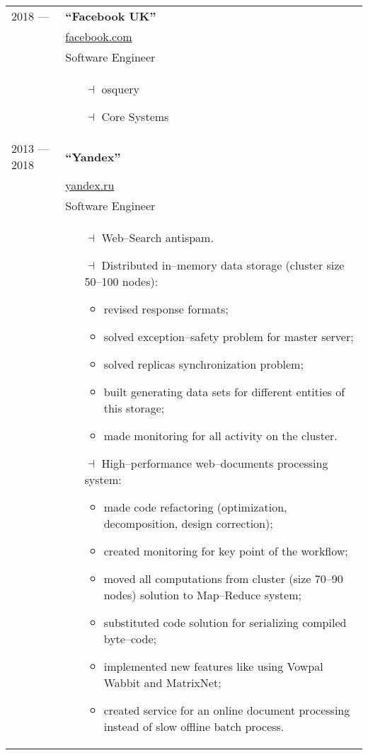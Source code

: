 \documentclass[a4paper, 10pt]{article}
\begin{document}
\begin{longtable}{p{20mm}|p{140mm}}

2018 ---
& \textbf{``Facebook UK''} \\
& \href{https://facebook.com/}{facebook.com} \\
& Software Engineer \\
& \begin{itemize}[topsep = 0pt, itemsep = 0pt]
    \item[$\dashv$] osquery
    \item[$\dashv$] Core Systems
\end{itemize}
\\

2013 --- 2018
& \textbf{``Yandex''} \\
& \href{https://yandex.ru/}{yandex.ru} \\
& Software Engineer \\
& \begin{itemize}[topsep = 0pt, itemsep = 0pt]
    \item[$\dashv$] Web--Search antispam.
    \item[$\dashv$] Distributed in--memory data storage (cluster size 50--100 nodes):
        \begin{itemize}[topsep = 0pt, itemsep = 0pt]
            \item revised response formats;
            \item solved exception--safety problem for master server;
            \item solved replicas synchronization problem;
            \item built generating data sets for different entities of this storage;
            \item made monitoring for all activity on the cluster.
        \end{itemize}
    \item[$\dashv$] High--performance web--documents processing system:
        \begin{itemize}[topsep = 0pt, itemsep = 0pt]
            \item made code refactoring (optimization, decomposition, design correction);
            \item created monitoring for key point of the workflow;
            \item moved all computations from cluster (size 70--90 nodes) solution to Map--Reduce system;
            \item substituted code solution for serializing compiled byte--code;
            \item implemented new features like using Vowpal Wabbit and MatrixNet;
            \item created service for an online document processing instead of slow offline batch process.
        \end{itemize}
\end{itemize}
\\


\end{longtable}
\end{document}
